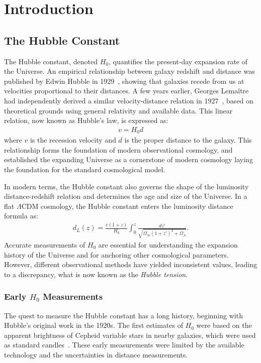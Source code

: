 \chapter{Introduction}
\label{chap:introduction}

\section{The Hubble Constant}
The Hubble constant, denoted $H_0$, quantifies the present-day expansion rate of the Universe. An empirical relationship between galaxy redshift and distance was published by Edwin Hubble in 1929~\citep{hubble1929}, showing that galaxies recede from us at velocities proportional to their distances. A few years earlier, Georges Lemaître had independently derived a similar velocity-distance relation in 1927~\citep{lemaitre1927univers}, based on theoretical grounds using general relativity and available data. This linear relation, now known as Hubble's law, is expressed as:
\begin{align}
    v = H_0 d
\end{align}
where $v$ is the recession velocity and $d$ is the proper distance to the galaxy. This relationship forms the foundation of modern observational cosmology, and established the expanding Universe as a cornerstone of modern cosmology laying the foundation for the standard cosmological model. 


In modern terms, the Hubble constant also governs the shape of the luminosity distance-redshift relation and determines the age and size of the Universe. In a flat $\Lambda$CDM cosmology, the Hubble constant enters the luminosity distance formula as:
\begin{align}
    d_L(z) = \frac{c(1+z)}{H_0} \int_0^z \frac{dz'}{\sqrt{\Omega_m(1+z')^3 + \Omega_\Lambda}}.
\end{align}
Accurate measurements of $H_0$ are essential for understanding the expansion history of the Universe and for anchoring other cosmological parameters. However, different observational methods have yielded inconsistent values, leading to a discrepancy, what is now known as the \textit{Hubble tension}.

\subsection{Early $H_0$ Measurements}
The quest to measure the Hubble constant has a long history, beginning with Hubble's original work in the 1920s. The first estimates of $H_0$ were based on the apparent brightness of Cepheid variable stars in nearby galaxies, which were used as standard candles~\citep{hubble1929}. These early measurements were limited by the available technology and the uncertainties in distance measurements.


